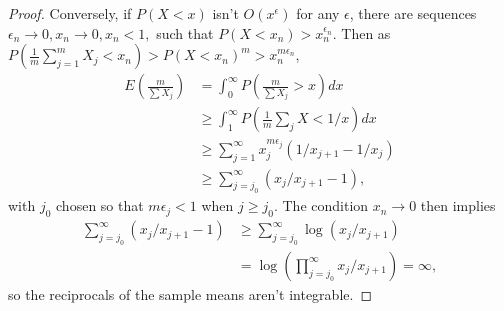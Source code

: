 \documentclass[12pt]{article}
\newcommand{\E}{E}
\renewcommand{\P}{P}
\newcommand{\x}{X}
\begin{document}
\begin{appendices}
\begin{proof}
    Conversely, if $\P(\x<x)$ isn't $O(x^\epsilon)$ for any $\epsilon$, there are sequences $\epsilon_n \to 0, x_n\to 0, x_n<1,$ such that $\P(\x<x_n)>x_n^{\epsilon_n}$. Then as $\P(\frac{1}{m}\sum_{j=1}^m\x_j < x_n) > \P(\x<x_n)^m > x_n^{m\epsilon_n}$,
    \begin{align}
      \E\left(\frac{m}{\sum \x_j}\right) &= \int_0^\infty \P\left(\frac{m}{\sum\x_j}>x\right)dx\\
                              &\ge \int_1^\infty \P\left(\frac{1}{m}\sum_j\x < 1/x\right)dx\\
                              &\ge \sum_{j=1}^\infty x_j^{m\epsilon_j}(1/x_{j+1}-1/x_j)\\
                              &\ge \sum_{j=j_0}^\infty (x_j/x_{j+1}-1),
    \end{align}
    with $j_0$ chosen so that $m\epsilon_j<1$ when $j\ge j_0$. The condition $x_n\to 0$ then implies
    \begin{align}
      \sum_{j=j_0}^\infty (x_j/x_{j+1}-1) &\ge \sum_{j=j_0}^\infty \log(x_j/x_{j+1})\\
                                        &=\log\left(\prod_{j=j_0}^\infty x_j/x_{j+1}\right)=\infty,
    \end{align}
    so the reciprocals of the sample means aren't integrable. %
  \end{proof}


\end{appendices}
    
\end{document}
